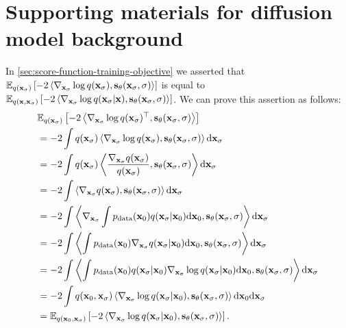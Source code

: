 \chapter{Supporting materials for diffusion model background}

\label{sec:proof-that-diffusion-does-score-matching}

In \cref{sec:score-function-training-objective} we asserted that $\mathbb{E}_{q({\mathbf{x}}_\sigma)} \left[ - 2 \left\langle \nabla_{{\mathbf{x}}_\sigma} \log q({\mathbf{x}}_\sigma), {\mathbf{s}}_\theta({\mathbf{x}}_\sigma, \sigma) \right\rangle \right]$ is equal to $\mathbb{E}_{q({\mathbf{x}}, {\mathbf{x}}_\sigma)} \left[ -2 \left\langle \nabla_{{\mathbf{x}}_\sigma} \log q({\mathbf{x}}_\sigma|{\mathbf{x}}), {\mathbf{s}}_\theta({\mathbf{x}}_\sigma, \sigma) \right\rangle  \right]$.
We can prove this assertion as follows:
\begin{align}
\allowdisplaybreaks
    & \EX_{q(\rvx_\sigma)} \left[ - 2 \left\langle \nabla_{\rvx_\sigma} \log q(\rvx_\sigma)^\top, \rvs_\theta(\rvx_\sigma, \sigma) \right\rangle \right] \\
    &= - 2 \int q(\rvx_\sigma) \left\langle \nabla_{\rvx_\sigma} \log q(\rvx_\sigma ), \rvs_\theta(\rvx_\sigma, \sigma) \right\rangle \mathrm{d} \rvx_\sigma  \\
    &= - 2 \int q(\rvx_\sigma ) \left\langle \frac{\nabla_{\rvx_\sigma} q(\rvx_\sigma)}{q(\rvx_\sigma )}, \rvs_\theta(\rvx_\sigma, \sigma) \right\rangle \mathrm{d} \rvx_\sigma  \\
    &= - 2 \int \left\langle \nabla_{\rvx_\sigma} q(\rvx_\sigma ), \rvs_\theta(\rvx_\sigma, \sigma) \right\rangle \mathrm{d} \rvx_\sigma  \\
    &= - 2 \int \left\langle \nabla_{\rvx_\sigma} \int \pdata(\rvx_0) q(\rvx_\sigma|\rvx_0) \mathrm{d}\rvx_0, \rvs_\theta(\rvx_\sigma, \sigma) \right\rangle \mathrm{d} \rvx_\sigma  \\
    &= - 2 \int \left\langle \int \pdata(\rvx_0) \nabla_{\rvx_\sigma} q(\rvx_\sigma|\rvx_0) \mathrm{d}\rvx_0, \rvs_\theta(\rvx_\sigma, \sigma) \right\rangle \mathrm{d} \rvx_\sigma  \\
    &= - 2 \int \left\langle \int \pdata(\rvx_0) q(\rvx_\sigma|\rvx_0) \nabla_{\rvx_\sigma} \log q(\rvx_\sigma|\rvx_0) \mathrm{d}\rvx_0, \rvs_\theta(\rvx_\sigma, \sigma) \right\rangle \mathrm{d} \rvx_\sigma  \\
    &= - 2 \int q(\rvx_0, \rvx_\sigma) \left\langle \nabla_{\rvx_\sigma} \log q(\rvx_\sigma|\rvx_0), \rvs_\theta(\rvx_\sigma, \sigma) \right\rangle  \mathrm{d}\rvx_0 \mathrm{d} \rvx_\sigma  \\
    &= \EX_{q(\rvx_0, \rvx_\sigma)} \left[ -2 \left\langle \nabla_{\rvx_\sigma} \log q(\rvx_\sigma|\rvx_0), \rvs_\theta(\rvx_\sigma, \sigma) \right\rangle  \right].
\end{align}
